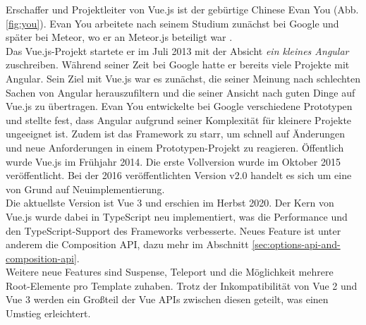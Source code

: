 Erschaffer und Projektleiter von Vue.js ist der gebürtige Chinese Evan You (Abb. \ref{fig:you}).
Evan You arbeitete nach seinem Studium zunächst bei Google und später bei Meteor, wo er
an Meteor.js beteiligt war \cite{linkedinYou}.
\\
Das Vue.js-Projekt startete er im Juli 2013 mit der Absicht \emph{ ein kleines Angular}
zuschreiben.
Während seiner Zeit bei Google hatte er bereits viele Projekte mit Angular.
Sein Ziel mit Vue.js war es zunächst, die seiner Meinung nach schlechten Sachen von Angular herauszufiltern
und die seiner Ansicht nach guten Dinge auf Vue.js zu übertragen.
Evan You entwickelte bei Google verschiedene Prototypen und stellte fest,
dass Angular aufgrund seiner Komplexität für kleinere Projekte ungeeignet ist.
Zudem ist das Framework zu starr, um schnell auf Änderungen und neue Anforderungen in einem Prototypen-Projekt zu reagieren.
Öffentlich wurde Vue.js im Frühjahr 2014.
Die erste Vollversion wurde im Oktober 2015 veröffentlicht.
Bei der 2016 veröffentlichten Version v2.0 handelt es sich um eine von Grund auf Neuimplementierung. \cite[1:11-4:42]{vueNYC}
\\
Die aktuellste Version ist Vue 3 und erschien im Herbst 2020.
Der Kern von Vue.js wurde dabei in TypeScript neu implementiert, was die Performance und den TypeScript-Support des Frameworks verbesserte.
Neues Feature ist unter anderem die Composition API, dazu mehr im Abschnitt \ref{sec:options-api-and-composition-api}. \cite{konstantinidis2020}
\\
Weitere neue Features sind Suspense, Teleport und die Möglichkeit mehrere Root-Elemente pro Template zuhaben.
Trotz der Inkompatibilität von Vue 2 und Vue 3 werden ein Großteil der Vue APIs zwischen diesen geteilt,
was einen Umstieg erleichtert. \cite{vueFAQ}

